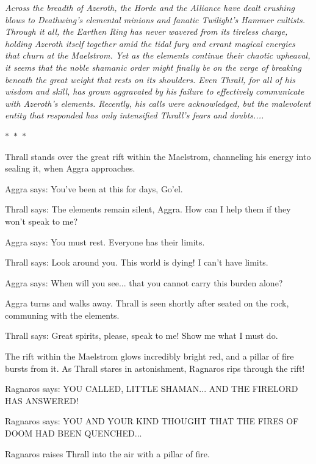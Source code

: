 \textit{Across the breadth of Azeroth, the Horde and the Alliance have dealt crushing blows to Deathwing's elemental minions and fanatic Twilight's Hammer cultists. Through it all, the Earthen Ring has never wavered from its tireless charge, holding Azeroth itself together amid the tidal fury and errant magical energies that churn at the Maelstrom. Yet as the elements continue their chaotic upheaval, it seems that the noble shamanic order might finally be on the verge of breaking beneath the great weight that rests on its shoulders. Even Thrall, for all of his wisdom and skill, has grown aggravated by his failure to effectively communicate with Azeroth's elements. Recently, his calls were acknowledged, but the malevolent entity that responded has only intensified Thrall's fears and doubts....}


\begin{center}
  $\ast$~$\ast$~$\ast$
\end{center}

Thrall stands over the great rift within the Maelstrom, channeling his energy into sealing it, when Aggra approaches.

Aggra says: You've been at this for days, Go'el.

Thrall says: The elements remain silent, Aggra. How can I help them if they won't speak to me?

Aggra says: You must rest. Everyone has their limits.

Thrall says: Look around you. This world is dying! I can't have limits.

Aggra says: When will you see... that you cannot carry this burden alone?

Aggra turns and walks away. Thrall is seen shortly after seated on the rock, communing with the elements.

Thrall says: Great spirits, please, speak to me! Show me what I must do.

The rift within the Maelstrom glows incredibly bright red, and a pillar of fire bursts from it. As Thrall stares in astonishment, Ragnaros rips through the rift!

Ragnaros says: YOU CALLED, LITTLE SHAMAN... AND THE FIRELORD HAS ANSWERED!

Ragnaros says: YOU AND YOUR KIND THOUGHT THAT THE FIRES OF DOOM HAD BEEN QUENCHED...

Ragnaros raises Thrall into the air with a pillar of fire.

